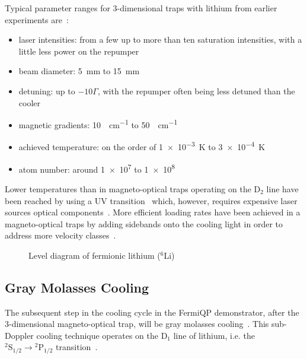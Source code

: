 Typical parameter ranges for 3-dimensional traps with lithium from earlier experiments are~\cite{
    tiecke_high-flux_2009,
    kawanaka_decay_1993,
    schunemann_magneto-optic_1998,
    mewes_simultaneous_1999,
    hilker_laser_2012,
    kerkmann_novel_2019,
    ladouceur_compact_2009,
    chen_lithium-cesium_2021,    
    burchianti_efficient_2014,
    li_enhanced_2015,
}:
\begin{itemize}
    \item laser intensities: from a few up to more than ten saturation intensities, with a little less power on the repumper
    \item beam diameter: \SI{5}{\milli\meter} to \SI{15}{\milli\meter}
    \item detuning: up to $-10 \Gamma$, with the repumper often being less detuned than the cooler
    \item magnetic gradients: \SI{10}{\gauss\per\centi\meter} to \SI{50}{\gauss\per\centi\meter}
    \item achieved temperature: on the order of \SI{1e-3}{\kelvin} to \SI{3e-4}{\kelvin}
    \item atom number: around \SI{1e7}{} to \SI{1e8}{}
\end{itemize}

Lower temperatures than in magneto-optical traps operating on the D$_2$ line have been reached by using a UV transition~\cite{duarte_all-optical_2011,omran_microscopic_2015} which, however, requires expensive laser sources optical components~\cite{burchianti_efficient_2014}. More efficient loading rates have been achieved in a magneto-optical traps by adding sidebands onto the cooling light in order to address more velocity classes~\cite{li_enhanced_2015}.


\begin{figure}
    \caption{Level diagram of fermionic lithium ($^6$Li)}\label{fig:lithium_level_diagram}
\end{figure}

\subsection*{Gray Molasses Cooling}
The subsequent step in the cooling cycle in the FermiQP demonstrator, after the 3-dimensional magneto-optical trap, will be gray molasses cooling~\cite{grynberg_proposal_1994,weidemuller_novel_1994}. This sub-Doppler cooling technique operates on the D$_1$ line of lithium, i.e. the $^2\text{S}_{1/2} \rightarrow {^2\text{P}_{1/2}}$ transition~\cite{burchianti_efficient_2014}.

